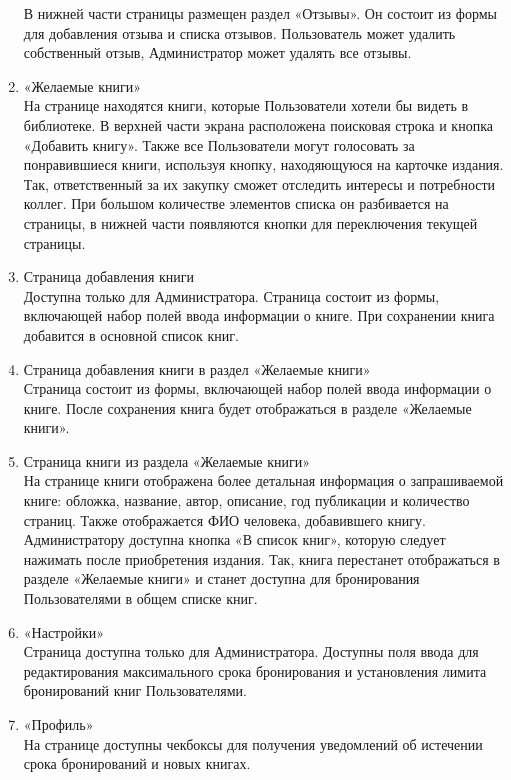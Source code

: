 \documentclass[project.tex]{subfiles}
\begin{document}
\begin{enumerate}
    В нижней части страницы размещен раздел «Отзывы». Он состоит из формы для добавления отзыва и списка отзывов. Пользователь может удалить собственный отзыв, Администратор может удалять все отзывы.
    \item «Желаемые книги»\\
    На странице находятся книги, которые Пользователи хотели бы видеть в библиотеке. В верхней части экрана расположена поисковая строка и кнопка «Добавить книгу». Также все Пользователи могут голосовать за понравившиеся книги, используя кнопку, находяющуюся на карточке издания. Так, ответственный за их закупку сможет отследить интересы и потребности коллег. 
    При большом количестве элементов списка он разбивается на страницы, в нижней части появляются кнопки для переключения текущей страницы.
    \item Страница добавления книги\\
    Доступна только для Администратора. Страница состоит из формы, включающей набор полей ввода информации о книге. При сохранении книга добавится в основной список книг.
    \item Страница добавления книги в раздел «Желаемые книги»\\
    Страница состоит из формы, включающей набор полей ввода информации о книге. После сохранения книга будет отображаться в разделе «Желаемые книги».
    \item Страница книги из раздела «Желаемые книги»\\
    На странице книги отображена более детальная информация о запрашиваемой книге: обложка, название, автор, описание, год публикации и количество страниц. Также отображается ФИО человека, добавившего книгу. Администратору доступна кнопка «В список книг», которую следует нажимать после приобретения издания. Так, книга перестанет отображаться в разделе «Желаемые книги» и станет доступна для бронирования Пользователями в общем списке книг.
    \item «Настройки»\\
    Страница доступна только для Администратора. Доступны поля ввода для редактирования максимального срока бронирования и установления лимита бронирований книг Пользователями.
    \item «Профиль»\\
    На странице доступны чекбоксы для получения уведомлений об истечении срока бронирований и новых книгах.
\end{enumerate}
\end{document}
